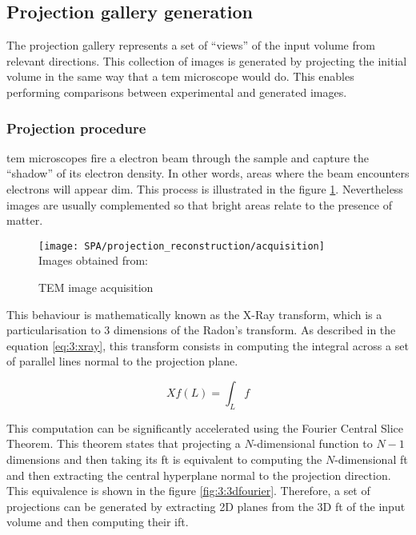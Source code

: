 \documentclass[../main.tex]{subfiles}
\begin{document}
\subsection{Projection gallery generation}
The projection gallery represents a set of ``views'' of the input volume from relevant directions. This collection of images is generated by projecting the initial volume in the same way that a \gls{tem} microscope would do. This enables performing comparisons between experimental and generated images. 

\subsubsection{Projection procedure}
\Gls{tem} microscopes fire a electron beam through the sample and capture the ``shadow'' of its electron density. In other words, areas where the beam encounters electrons will appear dim. This process is illustrated in the figure \ref{fig:3:projection}. Nevertheless images are usually complemented so that bright areas relate to the presence of matter.

\begin{figure}[h]
    \centering
    \texttt{[image: SPA/projection\_reconstruction/acquisition]}\\
    Images obtained from: \cite{greg}
    \caption{TEM image acquisition}
    \label{fig:3:projection}
\end{figure}

This behaviour is mathematically known as the X-Ray transform, which is a particularisation to 3 dimensions of the Radon's transform. As described in the equation \ref{eq:3:xray}, this transform consists in computing the integral across a set of parallel lines normal to the projection plane.

\begin{equation}\label{eq:3:xray}
    Xf(L) = \int_L f
\end{equation}

This computation can be significantly accelerated using the Fourier Central Slice Theorem. This theorem states that projecting a $N$-dimensional function to $N-1$ dimensions and then taking its \gls{ft} is equivalent to computing the $N$-dimensional \gls{ft} and then extracting the central hyperplane normal to the projection direction. This equivalence is shown in the figure \ref{fig:3:3dfourier}. Therefore, a set of projections can be generated by extracting 2D planes from the 3D \gls{ft} of the input volume and then computing their \gls{ift}.
\end{document}
